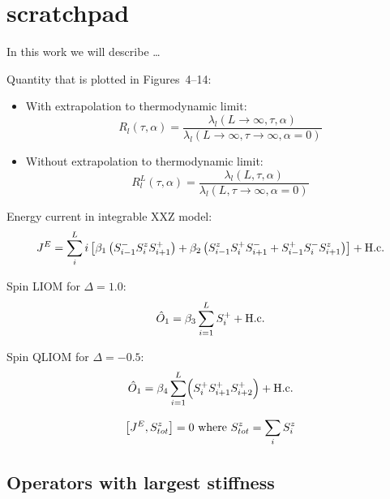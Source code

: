 \chapter{scratchpad}
\thispagestyle{chapterBeginStyle}

In this work we will describe \ldots~\autocite{Mierzejewski2015a}



\noindent Quantity that is plotted in Figures~4--14:
\begin{itemize}
    \item 
    With extrapolation to thermodynamic limit:
    \begin{equation}
        R_l(\tau,\alpha) = \frac{\lambda_l(L\rightarrow \infty,\tau,\alpha)}
        {\lambda_l(L\rightarrow \infty,\tau \rightarrow \infty,\alpha=0)}
        \label{eq:R1 extrap}
    \end{equation}
    \item
    Without extrapolation to thermodynamic limit:
    \begin{equation}
        R^L_l(\tau,\alpha) = \frac{\lambda_l(L,\tau,\alpha)}
        {\lambda_l(L,\tau \rightarrow \infty,\alpha=0)}
        \label{eq:R1 no extrap}
    \end{equation}
\end{itemize}


\noindent Energy current in integrable XXZ model: 
\begin{align}
    J^E = \sum_i^L i\left[\beta_1 \left(S^{-}_{i-1}S^{z}_{i}S^{+}_{i+1}\right) + \beta_2 \left(S^{z}_{i-1}S^{+}_{i}S^{-}_{i+1}+S^{+}_{i-1}S^{-}_{i}S^{z}_{i+1}\right)\right] + \text{H.c.}
\end{align}


\noindent Spin LIOM for \(\Delta=1.0\):
\begin{equation}
    \hat{O}_{1} =  \beta_3\sum_{i=1}^{L} S^{+}_{i} + \text{H.c.}
\end{equation}

\noindent Spin QLIOM for \(\Delta=-0.5\):
\begin{equation}
    \hat{O}_{1} =\beta_4 \sum_{i=1}^{L} \Bigl( S^{+}_{i}S^{+}_{i+1}S^{+}_{i+2}\Bigr) + \text{H.c.}
\end{equation}

\begin{equation*}
    \comm{J^E}{\Sz_{tot}} = 0 \text{   where   } \Sz_{tot} = \sum_i \Sz_i
  \end{equation*}
  
  
\section{Operators with largest stiffness}

